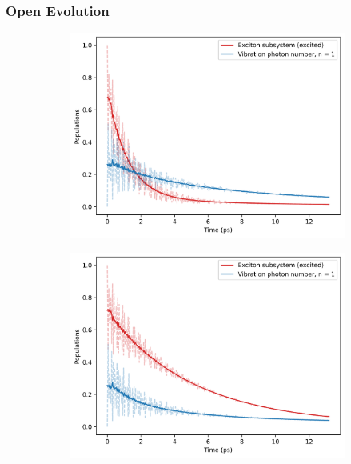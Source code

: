 \documentclass[11pt]{article}
\begin{document}
\subsubsection{Open Evolution}


\begin{figure}[H]
    \centering
    \begin{subfigure}{0.45\textwidth}
        \centering
        \includegraphics[width=\linewidth]{Research Project/Code/results/ExVib/Open/Population/pops_ex_spont_e0.png}
        \caption{}
        \label{fig:EVM_OQS_Pop_spont}
    \end{subfigure}
    \hfill
    \begin{subfigure}{0.45\textwidth}
        \centering
        \includegraphics[width=\linewidth]{Research Project/Code/results/ExVib/Open/Population/pops_ex_therm_e0.png}
        \caption{}
        \label{fig:EVM_OQS_Pop_therm}
    \end{subfigure}
    

\end{figure}
\end{document}
